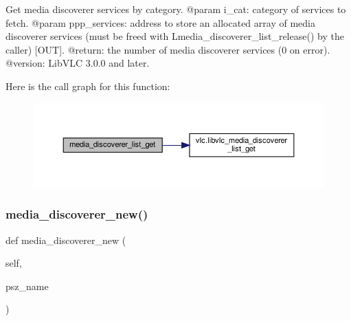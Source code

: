 \begin{DoxyVerb}Get media discoverer services by category.
@param i_cat: category of services to fetch.
@param ppp_services: address to store an allocated array of media discoverer services (must be freed with L{media_discoverer_list_release}() by the caller) [OUT].
@return: the number of media discoverer services (0 on error).
@version: LibVLC 3.0.0 and later.
\end{DoxyVerb}
 Here is the call graph for this function\+:
\nopagebreak
\begin{figure}[H]
\begin{center}
\leavevmode
\includegraphics[width=350pt]{classvlc_1_1_instance_aa4bc2bb5925ba99e5946cb8daa03492e_cgraph}
\end{center}
\end{figure}
\mbox{\label{classvlc_1_1_instance_ac61d7656e60513812c564af4487dcb67}} 
\subsubsection{\texorpdfstring{media\+\_\+discoverer\+\_\+new()}{media\_discoverer\_new()}}
{\footnotesize\ttfamily def media\+\_\+discoverer\+\_\+new (\begin{DoxyParamCaption}\item[{}]{self,  }\item[{}]{psz\+\_\+name }\end{DoxyParamCaption})}

